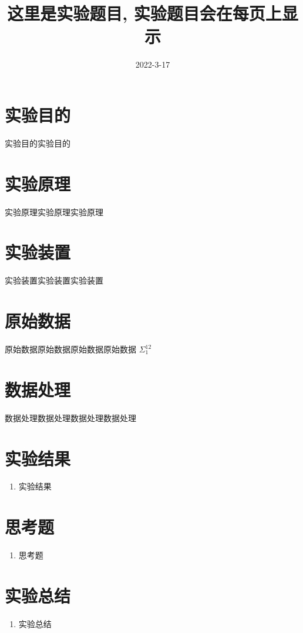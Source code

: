 \documentclass[12pt]{ustcreport}
\date{2022-3-17}			%
\title{这里是实验题目, 实验题目会在每页上显示}
\begin{document}
\section{实验目的}
实验目的实验目的
\section{实验原理}
实验原理实验原理实验原理
\section{实验装置}
实验装置实验装置实验装置
\section{原始数据}
原始数据原始数据原始数据原始数据
$\Sigma _1^{12}$

\section{数据处理}
数据处理数据处理数据处理数据处理
\section{实验结果}
\begin{enumerate}
    \item 实验结果
\end{enumerate}
\section{思考题}
\begin{enumerate}
    \item 思考题
\end{enumerate}
\section{实验总结}
\begin{enumerate}
    \item 实验总结
\end{enumerate}
\end{document}
